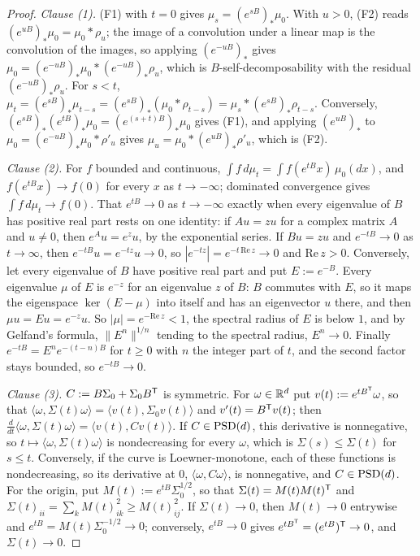 \begin{proof}
\leanok
\emph{Clause (1).} (F1) with $t = 0$ gives $\mu_s = (e^{sB})_*\mu_0$. With $u > 0$, (F2) reads
$(e^{uB})_*\mu_0 = \mu_0 * \rho_u$; the image of a convolution under a linear map is the
convolution of the images, so applying $(e^{-uB})_*$ gives
$\mu_0 = (e^{-uB})_*\mu_0 * (e^{-uB})_*\rho_u$, which is $B$-self-decomposability with the residual
$(e^{-uB})_*\rho_u$. For $s < t$, $\mu_t = (e^{sB})_*\mu_{t-s} = (e^{sB})_*(\mu_0 * \rho_{t-s})
= \mu_s * (e^{sB})_*\rho_{t-s}$. Conversely, $(e^{sB})_*(e^{tB})_*\mu_0 = (e^{(s+t)B})_*\mu_0$ gives
(F1), and applying $(e^{uB})_*$ to $\mu_0 = (e^{-uB})_*\mu_0 * \rho'_u$ gives
$\mu_u = \mu_0 * (e^{uB})_*\rho'_u$, which is (F2).

\emph{Clause (2).} For $f$ bounded and continuous, $\int f\,d\mu_t = \int f(e^{tB}x)\,\mu_0(dx)$,
and $f(e^{tB}x) \to f(0)$ for every $x$ as $t \to -\infty$; dominated convergence gives
$\int f\,d\mu_t \to f(0)$. That $e^{tB} \to 0$ as $t \to -\infty$ exactly when every eigenvalue of
$B$ has positive real part rests on one identity: if $Au = zu$ for a complex matrix $A$ and
$u \ne 0$, then $e^Au = e^zu$, by the exponential series. If $Bu = zu$ and $e^{-tB} \to 0$ as
$t \to \infty$, then $e^{-tB}u = e^{-tz}u \to 0$, so $|e^{-tz}| = e^{-t\,\mathrm{Re}\,z} \to 0$ and
$\mathrm{Re}\,z > 0$. Conversely, let every eigenvalue of $B$ have positive real part and put
$E := e^{-B}$. Every eigenvalue $\mu$ of $E$ is $e^{-z}$ for an eigenvalue $z$ of $B$: $B$ commutes
with $E$, so it maps the eigenspace $\ker(E - \mu)$ into itself and has an eigenvector $u$ there,
and then $\mu u = Eu = e^{-z}u$. So $|\mu| = e^{-\mathrm{Re}\,z} < 1$, the spectral radius of $E$ is
below $1$, and by Gelfand's formula, $\|E^n\|^{1/n}$ tending to the spectral radius, $E^n \to 0$.
Finally $e^{-tB} = E^ne^{-(t - n)B}$ for $t \ge 0$ with $n$ the integer part of $t$, and the second
factor stays bounded, so $e^{-tB} \to 0$.

\emph{Clause (3).} $C := B\Sigma_0 + \Sigma_0B^{\mathsf{T}}$ is symmetric. For $\omega \in \mathbb{R}^d$ put
$v(t) := e^{tB^{\mathsf{T}}}\omega$, so that $\langle\omega,\Sigma(t)\omega\rangle = \langle v(t),\Sigma_0v(t)\rangle$
and $v'(t) = B^{\mathsf{T}}v(t)$; then
$\tfrac{d}{dt}\langle\omega,\Sigma(t)\omega\rangle = \langle v(t), Cv(t)\rangle$. If $C \in \mathrm{PSD}(d)$, this
derivative is nonnegative, so $t \mapsto \langle\omega,\Sigma(t)\omega\rangle$ is nondecreasing for every
$\omega$, which is $\Sigma(s) \le \Sigma(t)$ for $s \le t$. Conversely, if the curve is Loewner-monotone,
each of these functions is nondecreasing, so its derivative at $0$, $\langle\omega,C\omega\rangle$, is
nonnegative, and $C \in \mathrm{PSD}(d)$. For the origin, put $M(t) := e^{tB}\Sigma_0^{1/2}$, so that
$\Sigma(t) = M(t)M(t)^{\mathsf{T}}$ and $\Sigma(t)_{ii} = \sum_kM(t)_{ik}^2 \ge M(t)_{ij}^2$. If $\Sigma(t) \to 0$,
then $M(t) \to 0$ entrywise and $e^{tB} = M(t)\Sigma_0^{-1/2} \to 0$; conversely, $e^{tB} \to 0$ gives
$e^{tB^{\mathsf{T}}} = (e^{tB})^{\mathsf{T}} \to 0$, and $\Sigma(t) \to 0$.


\end{proof}
